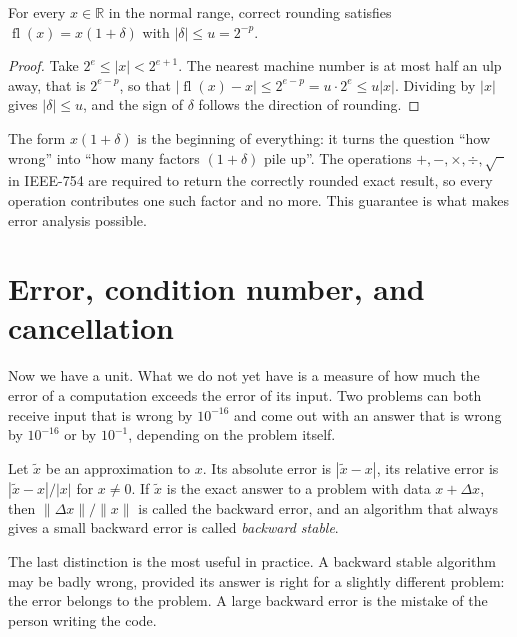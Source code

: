 \begin{teorema}
For every $x\in\mathbb{R}$ in the normal range, correct rounding satisfies
$\operatorname{fl}(x)=x(1+\delta)$ with $|\delta|\le u=2^{-p}$.
\end{teorema}

\begin{proof}
Take $2^{e}\le|x|<2^{e+1}$. The nearest machine number is at most half an
ulp away, that is $2^{e-p}$, so that
$|\operatorname{fl}(x)-x|\le2^{e-p}=u\cdot2^{e}\le u|x|$. Dividing by $|x|$
gives $|\delta|\le u$, and the sign of $\delta$ follows the direction of rounding.
\end{proof}

The form $x(1+\delta)$ is the beginning of everything: it turns the question ``how
wrong'' into ``how many factors $(1+\delta)$ pile up''. The operations
$+,-,\times,\div,\sqrt{\phantom{x}}$ in IEEE-754 are required to return the correctly
rounded exact result, so every operation contributes one such factor
and no more. This guarantee is what makes error analysis possible.
\section{Error, condition number, and cancellation}

Now we have a unit. What we do not yet have is a measure of how much the error of a
computation exceeds the error of its input. Two problems can both receive input that is
wrong by $10^{-16}$ and come out with an answer that is wrong by $10^{-16}$ or by
$10^{-1}$, depending on the problem itself.


\begin{definisi}
Let $\tilde{x}$ be an approximation to $x$. Its absolute error is $|\tilde{x}-x|$, its
relative error is $|\tilde{x}-x|/|x|$ for $x\neq0$. If $\tilde{x}$ is the exact answer
to a problem with data $x+\Delta x$, then $\|\Delta x\|/\|x\|$ is called the backward
error, and an algorithm that always gives a small backward error is called
\emph{backward stable}.
\end{definisi}

The last distinction is the most useful in practice. A backward stable algorithm may be
badly wrong, provided its answer is right for a slightly different problem: the error
belongs to the problem. A large backward error is the mistake of the person writing the
code.

